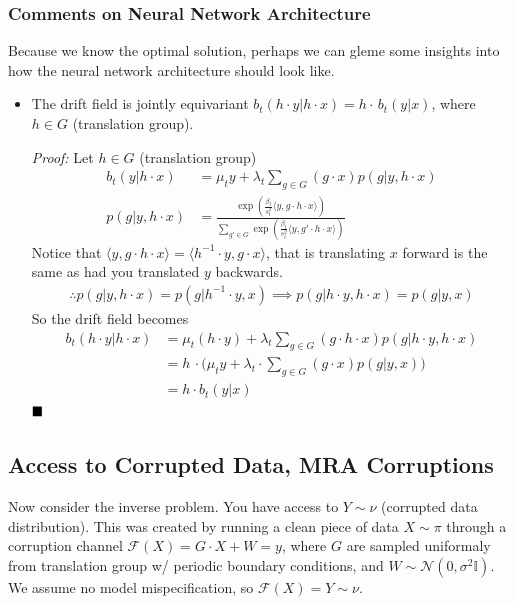 \documentclass[12pt,fleqn]{article}
\numberwithin{equation}{section}
\begin{document}
\subsubsection{Comments on Neural Network Architecture}
Because we know the optimal solution, perhaps we can gleme some insights into how the neural network architecture should look like.
\begin{itemize}
	\item The drift field is jointly equivariant $b_t(h\cdot y|h \cdot x) = h \cdot \, b_t(y | x)$, where $ h\in G$ (translation group).
	
	\emph{Proof:} Let $h \in G$ (translation group)
	\begin{align}
		b_t(y | h\cdot x) & = \mu_t y + \lambda_t \sum_{g \in G} (g \cdot x) p(g | y, h \cdot x)\\
		p(g | y, h \cdot x) & = \frac{\exp \left( \frac{\beta_t}{s_t^2} \langle y, g \cdot h \cdot x\rangle \right)}{\sum_{g' \in G} \exp \left( \frac{\beta_t}{s_t^2} \langle y, g' \cdot h \cdot x\rangle \right)}
	\end{align}
	Notice that $\langle y , g \cdot h \cdot x\rangle = \langle h^{-1} \cdot y, g\cdot x\rangle$, that is translating $x$ forward is the same as had you translated $y$ backwards.
	\begin{align}
		\therefore p(g | y, h\cdot x) = p(g | h^{-1} \cdot y , x) \implies p(g | h \cdot y , h \cdot x) = p(g| y, x)
	\end{align}
	So the drift field becomes
	\begin{align}
		b_t(h \cdot y | h\cdot x) & = \mu_t (h \cdot y) + \lambda_t \sum_{g \in G} (g \cdot h \cdot x) p(g | h \cdot y , h \cdot x)\\
		& = h\, \cdot \Big(\mu_t y + \lambda_t \cdot \sum_{g \in G} (g \cdot x) p(g | y , x) \Big)\\
		& = h \cdot b_t(y | x)
	\end{align}
	$\hfill\blacksquare$
\end{itemize}


\subsection{Access to Corrupted Data, MRA Corruptions}
Now consider the inverse problem. You have access to $Y \sim \nu$ (corrupted data distribution). This was created by running a clean piece of data $X \sim \pi$ through a corruption channel $\mathcal F(X) = G \cdot X + W = y$, where $G$ are sampled uniformaly from translation group w/ periodic boundary conditions, and $W \sim \mathcal N(0, \sigma^2 \mathbb I)$. We assume no model mispecification, so $\mathcal F(X) = Y \sim \nu$.
\end{document}
